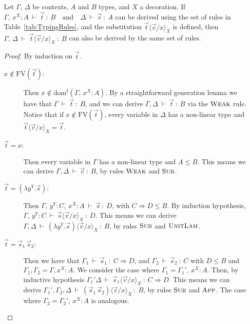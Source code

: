 \documentclass[a4paper,UKenglish,numberwithinsect,pdfa,anonymous]{lipics-v2021}
\theoremstyle{restatestyle}
\newcommand\ansubst[2]{\ensuremath{\langle #1 \rangle_{#2}}}
\newcommand\sdom[1]{\mathrm{dom}^{\sharp}(#1)}
\newcommand\FV[1]{\mathrm{FV}(#1)}
\def\Lam#1#2#3{\lambda#1^{#2}{.}#3} %
\def\Arr{\Rightarrow}
\def\TYP#1#2#3{#1~{\vdash}~#2~{:}~#3}
\begin{document}
\begin{lemma}[Substitution]\label{lem:Substitution}
  Let $\Gamma$, $\Delta$ be contexts, $A$ and $B$ types, and $X$ a decoration.
  If
  \(
    \TYP{\Gamma,\,x^{X}\!:\!A}{\vec{t}}{B}
    \quad\text{and}\quad
    \TYP{\Delta}{\vec{v}}{A}
  \) can be derived using the set of rules in Table~\ref{tab:TypingRules},
  and the substitution $\vec{t}\ansubst{\vec{v}/x}{X}$ is defined,
  then
  \(
    \TYP{\Gamma,\,\Delta}{\vec{t}\ansubst{\vec{v}/x}{X}}{B}
  \) can also be derived by the same set of rules.
\end{lemma}
\begin{proof}
  By induction on $\vec{t}$.
  \begin{description}
    \item[$x\not\in\FV{\vec{t}}$:] Then $x\not\in\sdom{\Gamma,\,x^{X}\!:\!A}$. By a straightforward generation lemma we have that $\TYP{\Gamma}{\vec{t}}{B}$, and we can derive $\TYP{\Gamma,\Delta}{\vec{t}}{B}$ via the $\textsc{Weak}$ rule. Notice that if $x\not\in\FV{\vec{t}}$, every variable in $\Delta$ has a non-linear type and $\vec{t}\ansubst{\vec{v}/x}{X}=\vec{t}$.
    
    \item[$\vec{t}=x$:] Then every variable in $\Gamma$ has a non-linear type and $A\leq B$. This means we can derive $\TYP{\Gamma,\Delta}{\vec{v}}{B}$, by rules $\textsc{Weak}$ and $\textsc{Sub}$.
    
    \item[$\vec{t}=(\Lam{y}{Y}{\vec{s}})$:] Then $\TYP{\Gamma,\,y^{Y}\!:\!C,\,x^{X}\!:\!A}{\vec{s}}{D}$, with $C\Arr D\leq B$. By induction hypothesis, $\TYP{\Gamma,\,y^{Y}\!:\!C}{\vec{s}\ansubst{\vec{v}/x}{X}}{D}$. This means we can derive $\TYP{\Gamma,\Delta}{(\Lam{y}{Y}{\vec{s}})\ansubst{\vec{v}/x}{X}}{B}$, by rules $\textsc{Sub}$ and $\textsc{UnitLam}$.
    
    \item[$\vec{t}=\vec{s}_{1}\,\vec{s}_{2}$:] Then we have that $\TYP{\Gamma_1}{\vec{s}_{1}}{C\Arr D}$, and $\TYP{\Gamma_2}{\vec{s}_{2}}{C}$ with $D\leq B$ and $\Gamma_1,\Gamma_2 = \Gamma,x^{X}\!:\!A$. We consider the case where $\Gamma_1 = \Gamma_1',\,x^{X}\!:\!A$. Then, by inductive hypothesis $\TYP{\Gamma_1'\Delta}{\vec{s}_{1}\ansubst{\vec{v}/x}{X}}{C\Arr D}$. This means we can derive $\TYP{\Gamma_1',\Gamma_2,\Delta}{(\vec{s}_{1}\,\vec{s}_{2})\ansubst{\vec{v}/x}{X}}{B}$, by rules $\textsc{Sub}$ and $\textsc{App}$. The case where $\Gamma_2 = \Gamma_2',\,x^{X}\!:\!A$ is analogous.
    

\end{description}
\end{proof}
\end{document}
